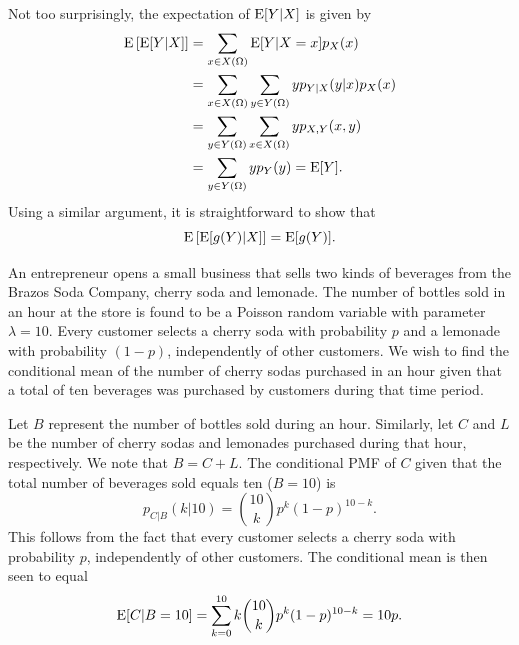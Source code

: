 Not too surprisingly, the expectation of $\mathrm{E} [Y | X]$ is given by
\begin{equation*}
\begin{split}
\mathrm{E} \left[ \mathrm{E} [Y | X] \right]
&= \sum_{x \in X(\Omega)} \mathrm{E} [Y | X = x] p_X (x) \\
&= \sum_{x \in X(\Omega)} \sum_{y \in Y(\Omega)} y p_{Y|X} (y|x) p_X (x) \\
&= \sum_{y \in Y(\Omega)} \sum_{x \in X(\Omega)} y p_{X,Y} (x, y) \\
&= \sum_{y \in Y(\Omega)} y p_{Y} (y)
= \mathrm{E} [Y] .
\end{split}
\end{equation*}
Using a similar argument, it is straightforward to show that
\begin{equation*}
\mathrm{E} \left[ \mathrm{E} [g (Y) | X] \right] = \mathrm{E} [g(Y)] .
\end{equation*}

\begin{example}
An entrepreneur opens a small business that sells two kinds of beverages from the Brazos Soda Company, cherry soda and lemonade.
The number of bottles sold in an hour at the store is found to be a Poisson random variable with parameter $\lambda = 10$.
Every customer selects a cherry soda with probability $p$ and a lemonade with probability $(1 - p)$, independently of other customers.
We wish to find the conditional mean of the number of cherry sodas purchased in an hour given that a total of ten beverages was purchased by customers during that time period.

Let $B$ represent the number of bottles sold during an hour.
Similarly, let $C$ and $L$ be the number of cherry sodas and lemonades purchased during that hour, respectively.
We note that $B = C + L$.
The conditional PMF of $C$ given that the total number of beverages sold equals ten ($B = 10$) is
\begin{equation} \label{equation:ConditionalPoisson}
p_{C|B} (k | 10)
= \binom{10}{k} p^k (1-p)^{10-k} .
\end{equation}
This follows from the fact that every customer selects a cherry soda with probability $p$, independently of other customers.
The conditional mean is then seen to equal
\begin{equation*}
\mathrm{E} [ C | B=10] = \sum_{k=0}^{10}
k \binom{10}{k} p^k (1-p)^{10-k} = 10 p .
\end{equation*}
\end{example}

